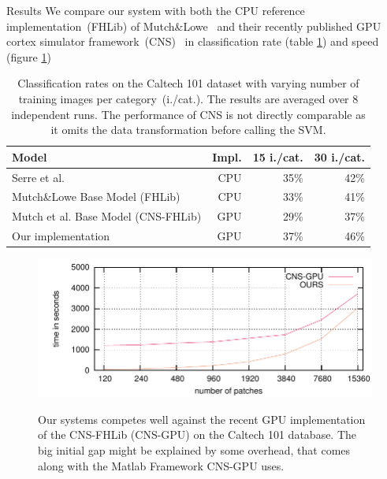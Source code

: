\documentclass[final]{beamer}
\begin{document}
\begin{frame}{}
\begin{columns}[t]
\begin{column}{.48\linewidth}
        \begin{block}{Results}
We compare our system with both the CPU reference implementation~(FHLib) of Mutch\&Lowe~\cite{mutch06} and their
recently published GPU cortex simulator framework~(CNS)~\cite{mutch10} in classification rate (table \ref{table:caltech}) and speed (figure \ref{fig:performance})
\newline
\begin{table}[t]
  \begin{center}

    \label{table:caltech}
    \begin{tabular}{|l|r|r|r|}
     \hline
      Model & Impl. & 15 i./cat. & 30 i./cat.\\
      \hline
      Serre et al. \cite{serre05}                          & CPU & 35\% & 42\% \\ %
		 
      Mutch\&Lowe Base Model (FHLib) \cite{mutch06}      & CPU & 33\% & 41\%\\ %
      Mutch et al. Base Model  (CNS-FHLib) \cite{mutch10} & GPU & 29\%  & 37\%\\ %
      Our implementation                     & GPU & 37\% & 46\%\\
      \hline
    \end{tabular}
        \caption{ Classification rates on the Caltech 101 dataset
      with varying number of training images per category~(i./cat.). 
      The results are averaged over  8 independent runs.  The performance of CNS is not directly
      comparable as it omits the data transformation before calling the SVM.
    }
  \end{center}
\end{table}

\begin{figure}[htb]
  \centering
    \includegraphics[width=\linewidth]{images/PNumTime_max} \\
  \caption{ Our systems competes well against the recent GPU
    implementation of the CNS-FHLib (CNS-GPU) on the Caltech 101 database. 
    The big initial gap might be explained by some overhead, that comes along
    with the Matlab Framework CNS-GPU uses. }
  \label{fig:performance}
\end{figure}
        \end{block}
        

\end{column}
\end{columns}
\end{frame}
\end{document}
